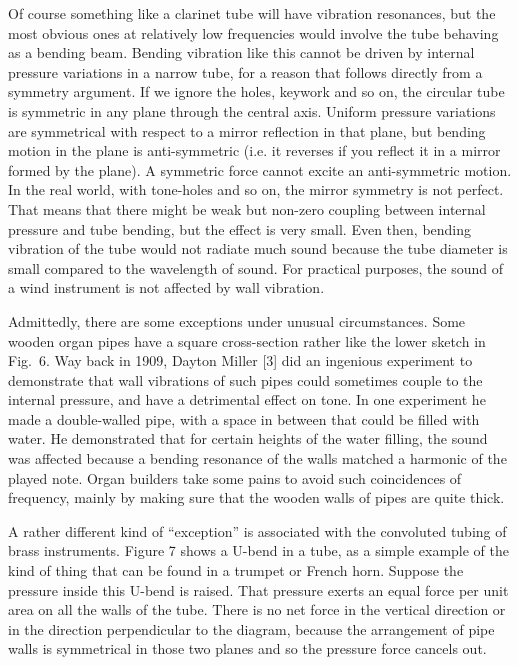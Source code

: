   Of course something like a clarinet tube will have vibration resonances, but 
  the most obvious ones at relatively low frequencies would involve the tube 
  behaving as a bending beam. Bending vibration like this cannot be driven by 
  internal pressure variations in a narrow tube, for a reason that follows 
  directly from a symmetry argument. If we ignore the holes, keywork and so on, 
  the circular tube is symmetric in any plane through the central axis. Uniform 
  pressure variations are symmetrical with respect to a mirror reflection in 
  that plane, but bending motion in the plane is anti-symmetric (i.e. it 
  reverses if you reflect it in a mirror formed by the plane). A symmetric 
  force cannot excite an anti-symmetric motion. In the real world, with 
  tone-holes and so on, the mirror symmetry is not perfect. That means that 
  there might be weak but non-zero coupling between internal pressure and tube 
  bending, but the effect is very small. Even then, bending vibration of the 
  tube would not radiate much sound because the tube diameter is small compared 
  to the wavelength of sound. For practical purposes, the sound of a wind 
  instrument is not affected by wall vibration. 

  Admittedly, there are some exceptions under unusual circumstances. Some 
  wooden organ pipes have a square cross-section rather like the lower sketch 
  in Fig.\ 6. Way back in 1909, Dayton Miller [3] did an ingenious experiment 
  to demonstrate that wall vibrations of such pipes could sometimes couple to 
  the internal pressure, and have a detrimental effect on tone. In one 
  experiment he made a double-walled pipe, with a space in between that could 
  be filled with water. He demonstrated that for certain heights of the water 
  filling, the sound was affected because a bending resonance of the walls 
  matched a harmonic of the played note. Organ builders take some pains to 
  avoid such coincidences of frequency, mainly by making sure that the wooden 
  walls of pipes are quite thick. 

  A rather different kind of “exception” is associated with the convoluted 
  tubing of brass instruments. Figure 7 shows a U-bend in a tube, as a simple 
  example of the kind of thing that can be found in a trumpet or French horn. 
  Suppose the pressure inside this U-bend is raised. That pressure exerts an 
  equal force per unit area on all the walls of the tube. There is no net force 
  in the vertical direction or in the direction perpendicular to the diagram, 
  because the arrangement of pipe walls is symmetrical in those two planes and 
  so the pressure force cancels out. 

